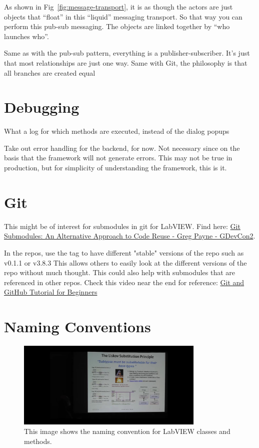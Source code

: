 \documentclass{article}
\begin{document}
As shown in Fig~\ref{fig:message-transport}, it is as though the actors are just objects that “float” in this “liquid” messaging transport.
So that way you can perform this pub-sub messaging.
The objects are linked together by “who launches who”.

Same as with the pub-sub pattern, everything is a publisher-subscriber.
It's just that most relationships are just one way.
Same with Git, the philosophy is that all branches are created equal

\section{Debugging}
\label{sec:debugging}

What a log for which methods are executed, instead of the dialog popups

Take out error handling for the backend, for now.
Not necessary since on the basis that the framework will not generate errors.
This may not be true in production, but for simplicity of understanding the framework, this is it.


\section{Git}
\label{sec:git}

This might be of interest for submodules in git for LabVIEW.
Find here: \href{https://www.youtube.com/watch?v=iv7WwDgyb0U}{Git Submodules: An Alternative Approach to Code Reuse - Greg Payne - GDevCon2}.

In the repos, use the tag to have different "stable" versions of the repo such as v0.1.1 or v3.8.3
This allows others to easily look at the different versions of the repo without much thought.
This could also help with submodules that are referenced in other repos.
Check this video near the end for reference: \href{https://www.youtube.com/watch?v=tRZGeaHPoaw&list=PLvDxiIkwuMQs0Uu6AIhTGqXahndMmfUyx&index=19}{Git and GitHub Tutorial for Beginners}

\section{Naming Conventions}
\label{sec:naming-conventions}

\begin{figure}[h]
    \centering
    \includegraphics[width=0.8\textwidth]{figures/dmitry_liskov_sub_principle}
    \caption{This image shows the naming convention for LabVIEW classes and methods.}
    \label{fig:dmitry-liskov-sub-principle}
\end{figure}
\end{document}
